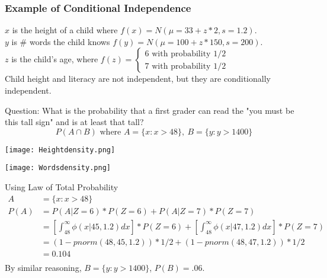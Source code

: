 \documentclass[aspectratio=169, handout]{beamer}
\numberwithin{equation}{section}
\begin{document}
\begin{frame}
\frametitle{Example of Conditional Independence}

$x$ is the height of a child where $f(x)=N(\mu=33+z*2, s= 1.2)$.\\ 
$y$ is \# words the child knows $f(y)=N(\mu=100+z*150, s= 200)$.\\
$z$ is the child's age, where $f(z)=\begin{cases} 6\text{ with probability }1/2\\ 7\text{ with probability }1/2\end{cases}$\\

\vspace{1 cm}
Child height and literacy are not independent, but they are conditionally independent.
\vspace{1 cm}

Question:  What is the probability that a first grader can read the "you must be this tall sign" and is at least that tall?
$$P(A\cap B)\text{ where }A=\{x: x>48\}, \ B=\{y: y>1400\}$$
\end{frame}

\begin{frame}
\begin{center}
\texttt{[image: Heightdensity.png]}
\end{center}
\end{frame}

\begin{frame}
\begin{center}
\texttt{[image: Wordsdensity.png]}
\end{center}
\end{frame}

\begin{frame}{Using Law of Total Probability}
\begin{align*}
A&=\{x: x>48\}\\
P(A)&=P(A|Z=6)*P(Z=6)+P(A|Z=7)*P(Z=7)\\
&=[\int_{48}^\infty \phi(x|45,1.2)dx]*P(Z=6)+[\int_{48}^\infty \phi(x|47,1.2)dx]*P(Z=7)\\
&=(1-pnorm(48, 45, 1.2) )*1/2+(1-pnorm(48, 47, 1.2) )*1/2\\
&=0.104\\
\end{align*}
By similar reasoning, $B=\{y: y>1400\}$, $P(B)=.06$.\\
\end{frame}
\end{document}
